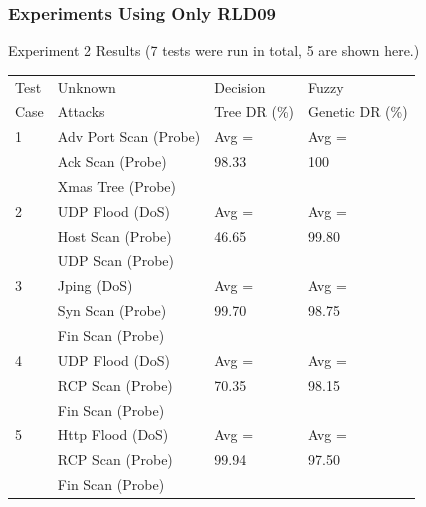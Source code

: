 \documentclass{beamer}
\begin{document}
\begin{frame}
	\frametitle{Experiments Using Only RLD09}
	Experiment 2 Results (7 tests were run in total, 5 are shown here.)
	
\begin{table}
\begin{footnotesize}
\begin{tabular}{llll}
Test & Unknown & Decision & Fuzzy\\
Case & Attacks & Tree DR (\%) & Genetic DR (\%)\\ \hline

1 & Adv Port Scan (Probe) & Avg = & Avg =\\
  & Ack Scan (Probe)                 & 98.33 & 100\\
  & Xmas Tree (Probe)                 &                 &\\ \hline

2 & UDP Flood (DoS) & Avg = & Avg =\\
  & Host Scan (Probe) & 46.65 & 99.80\\
  & UDP Scan (Probe) & &\\ \hline

3 & Jping (DoS) & Avg = & Avg =\\
  & Syn Scan (Probe) & 99.70 & 98.75\\
  & Fin Scan (Probe) & &\\ \hline

4 & UDP Flood (DoS) & Avg = & Avg =\\
  & RCP Scan (Probe) & 70.35 & 98.15\\
  & Fin Scan (Probe) & &\\ \hline

5 & Http Flood (DoS) & Avg = & Avg =\\
  & RCP Scan (Probe) & 99.94 & 97.50\\
  & Fin Scan (Probe) & &\\
\hline\end{tabular}
\end{footnotesize}
\end{table}
\end{frame}
\end{document}

